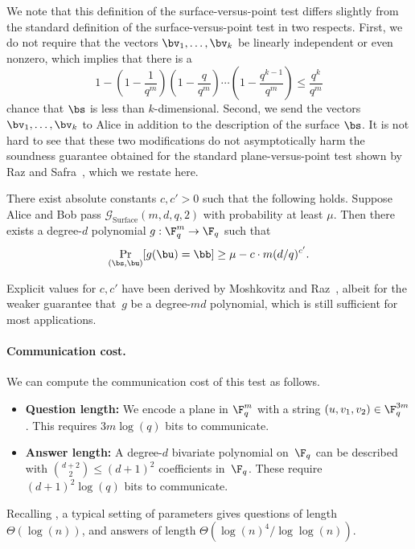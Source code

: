 \documentclass[11pt]{article}
\newcommand{\game}{\mathscr{G}}
\begin{document}
We note that this definition of the surface-versus-point test differs slightly from the standard
definition of the surface-versus-point test in two respects. First, we
do not require that the vectors $\bv_1, \ldots, \bv_k$ be linearly independent
or even nonzero, which implies that there is a
\begin{equation*}
1-
\left(1 -\frac{1}{q^m}\right)
\left(1 -\frac{q}{q^m}\right)
\cdots
\left(1 -\frac{q^{k-1}}{q^m}\right)
\leq \frac{q^k}{q^m}
\end{equation*}
 chance that $\bs$
is less than $k$-dimensional. Second, we send the vectors $\bv_1,
\ldots, \bv_k$ to Alice in addition to the description of the surface $\bs$. It
is not hard to see that these two modifications do not asymptotically harm the
soundness guarantee obtained for the standard plane-versus-point test shown by Raz and
Safra~\cite{RS97}, which we restate here.

\begin{theorem}[\cite{RS97}]\label{thm:raz-safra}
There exist absolute constants $c, c' > 0$ such that the following holds.
Suppose Alice and Bob pass $\game_{\mathrm{Surface}}(m,d,q,2)$ with probability at least $\mu$.
Then there exists a degree-$d$ polynomial $g:\F_q^m \rightarrow \F_q$ such that
\begin{equation*}
\Pr_{(\bs, \bu)}[g(\bu) = \bb] \geq \mu - c\cdot m (d/q)^{c'}.
\end{equation*}
\end{theorem}

Explicit values for $c, c'$ have been derived by Moshkovitz and Raz~\cite{MR08},
albeit for the weaker guarantee that~$g$ be a degree-$m d$ polynomial,
which is still sufficient for most applications.

\paragraph{Communication cost.}
We can compute the communication cost of this test as follows.

\begin{itemize}
\itemsep -.5pt
\item[$\circ$] \textbf{Question length:} We encode a plane in $\F_q^m$ with a string $(u, v_1, v_2) \in \F_q^{3m}$. This requires $3 m \log(q)$ bits to communicate.
\item[$\circ$] \textbf{Answer length:} A degree-$d$ bivariate polynomial on~$\F_q$ can be described with $\binom{d+2}{2} \leq (d+1)^2$ coefficients in~$\F_q$. These require $(d+1)^2 \log(q)$ bits to communicate.
\end{itemize}
\noindent
Recalling , a typical setting of parameters
gives questions of length $\Theta(\log(n))$,
and  answers of length $\Theta(\log(n)^4/\log\log(n))$.
\end{document}

